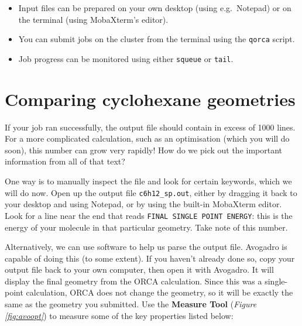 \documentclass[10pt]{article}
\newcommand{\figref}[1]{\textit{Figure \ref{fig:#1}}}
\begin{document}
\vspace{-0.2cm}

\begin{summary}
    \begin{itemize}[leftmargin=0.6cm]
        \item Input files can be prepared on your own desktop (using e.g.\ Notepad) or on the terminal (using MobaXterm's editor).
        \item You can submit jobs on the cluster from the terminal using the \texttt{qorca} script.
        \item Job progress can be monitored using either \texttt{squeue} or \texttt{tail}.
    \end{itemize}
\end{summary}

\section{Comparing cyclohexane geometries}

If your job ran successfully, the output file should contain in excess of 1000 lines. For a more complicated calculation, such as an optimisation (which you will do soon), this number can grow very rapidly! How do we pick out the important information from all of that text?

One way is to manually inspect the file and look for certain keywords, which we will do now. Open up the output file \texttt{c6h12\_sp.out}, either by dragging it back to your desktop and using Notepad, or by using the built-in MobaXterm editor. Look for a line near the end that reads \texttt{FINAL SINGLE POINT ENERGY}: this is the energy of your molecule in that particular geometry. Take note of this number.

Alternatively, we can use software to help us parse the output file. Avogadro is capable of doing this (to some extent). If you haven't already done so, copy your output file back to your own computer, then open it with Avogadro. It will display the final geometry from the ORCA calculation. Since this was a single-point calculation, ORCA does not change the geometry, so it will be exactly the same as the geometry you submitted. Use the \textbf{Measure Tool} (\figref{avoopt}) to measure some of the key properties listed below:
\end{document}
